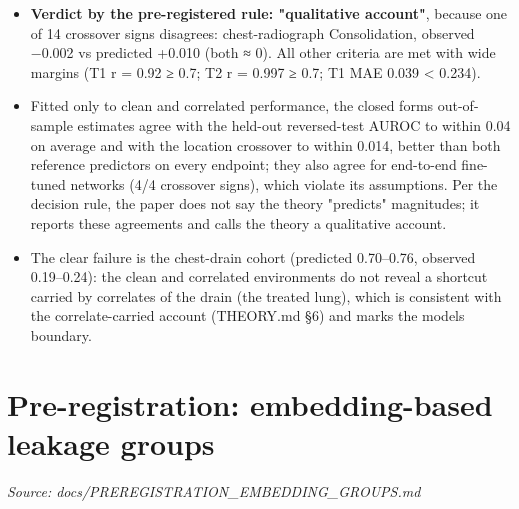 {\begin{itemize}

\item
  \textbf{Verdict by the pre-registered rule: "qualitative account"}, because one of 14 crossover signs disagrees:
  chest-radiograph Consolidation, observed −0.002 vs predicted +0.010 (both ≈ 0). All other criteria are met with
  wide margins (T1 r = 0.92 ≥ 0.7; T2 r = 0.997 ≥ 0.7; T1 MAE 0.039 \textless{} 0.234).
\item
  Fitted only to clean and correlated performance, the closed form\textquotesingle s out-of-sample estimates agree with the held-out
  reversed-test AUROC to within 0.04 on average and with the location crossover to within 0.014, better than both
  reference predictors on every endpoint; they also agree for end-to-end fine-tuned networks (4/4 crossover signs),
  which violate its assumptions. Per the decision rule, the paper does not say the theory "predicts" magnitudes; it
  reports these agreements and calls the theory a qualitative account.
\item
  The clear failure is the chest-drain cohort (predicted 0.70--0.76, observed 0.19--0.24): the clean and correlated
  environments do not reveal a shortcut carried by correlates of the drain (the treated lung), which is consistent
  with the correlate-carried account (THEORY.md §6) and marks the model\textquotesingle s boundary.
\end{itemize}

}

\section{Pre-registration: embedding-based leakage groups}\label{doc:PREREGISTRATION_EMBEDDING_GROUPS}
\noindent\textit{Source: docs/PREREGISTRATION\_EMBEDDING\_GROUPS.md}

